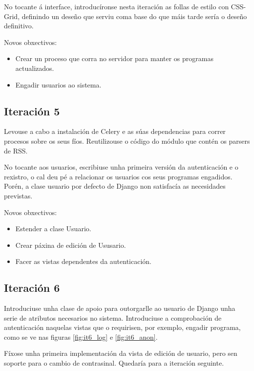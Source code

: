 No tocante á interface, introducíronse nesta iteración as follas de estilo con CSS-Grid, definindo un deseño que serviu coma base do que máis tarde sería o deseño definitivo.

Novos obxectivos:

\begin{itemize}
	\item Crear un proceso que corra no servidor para manter os programas actualizados.
	\item Engadir usuarios ao sistema. 
\end{itemize}

\subsection{Iteración 5}

Levouse a cabo a instalación de Celery e as súas dependencias para correr procesos sobre os seus fíos. Reutilizouse o código do módulo que contén os parsers de RSS. 

No tocante aos usuarios, escribiuse unha primeira versión da autenticación e o rexistro, o cal deu pé a relacionar os usuarios cos seus programas engadidos. Porén, a clase usuario por defecto de Django non satisfacía as necesidades previstas.

Novos obxectivos:

\begin{itemize}
	\item Estender a clase Usuario.
	\item Crear páxina de edición de Ususario.
	\item Facer as vistas dependentes da autenticación.
\end{itemize}

\subsection{Iteración 6}

Introduciuse unha clase de apoio para outorgarlle ao usuario de Django unha serie de atributos necesarios no sistema. Introduciuse a comprobación de autenticación naquelas vistas que o requirisen, por exemplo, engadir programa, como se ve nas figuras \ref{fig:it6_log} e \ref{fig:it6_anon}.

Fíxose unha primeira implementación da vista de edición de usuario, pero sen soporte para o cambio de contrasinal. Quedaría para a iteración seguinte.

